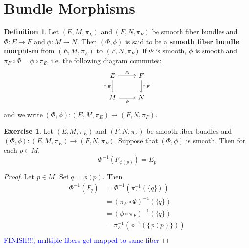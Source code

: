 \documentclass{book}
\theoremstyle{definition}
\newtheorem{defn}[definition]{Definition}
\newtheorem{ex}[definition]{Exercise}
\DeclareMathOperator*{\0}{\mbf{0}}
\DeclareMathOperator*{\1}{\mbf{1}}
\newcommand{\tbf}[1]{\textbf{#1}}
\newcommand{\tcb}[1]{\textcolor{blue}{#1}}
\begin{document}
	
	
	
	
	
	
	
	
	
	
	
	
	
	
	
	
	
	
	
	
	
	
	\newpage
	\section{Bundle Morphisms}
	
	\begin{defn}
		Let $(E, M, \pi_E)$ and $(F, N, \pi_F)$ be smooth fiber bundles and $\Phi: E \rightarrow F$ and $\phi: M \rightarrow N$. Then $(\Phi, \phi)$ is said to be a \tbf{smooth fiber bundle morphism} from $(E, M, \pi_E)$ to $(F, N, \pi_F)$ if $\Phi$ is smooth, $\phi$ is smooth and $\pi_F \circ \Phi = \phi \circ \pi_E$, 
		i.e. the following diagram commutes:
		\[ 
		\begin{tikzcd}
			E \arrow[r, "\Phi"] \arrow[d, "\pi_E"'] & F  \arrow[d, "\pi_F"] \\
			M \arrow[r, "\phi"']                  & N
		\end{tikzcd}
		\] 
		and we write $(\Phi, \phi): (E, M, \pi_E) \rightarrow (F, N, \pi_F)$.
	\end{defn}
	
	\begin{ex}
		Let $(E, M, \pi_E)$ and $(F, N, \pi_F)$ be smooth fiber bundles and $(\Phi, \phi): (E, M, \pi_E) \rightarrow (F, N, \pi_F)$. Suppose that $(\Phi, \phi)$ is smooth. Then for each $p \in M$, 
		$$\Phi^{-1}(F_{\phi(p)}) = E_{p}$$
	\end{ex}

	\begin{proof}
		Let $p \in M$. Set $q = \phi(p)$. Then 
		\begin{align*}
			\Phi^{-1}(F_{q})
			& = \Phi^{-1}(\pi_F^{-1}(\{q\})) \\
			& = (\pi_F \circ \Phi)^{-1}(\{q\}) \\
			& = (\phi \circ \pi_E)^{-1} (\{q\}) \\
			& = \pi_E^{-1} ( \phi^{-1}( \{\phi(p)\})) \\
		\end{align*}
	\tcb{FINISH!!!, multiple fibers get mapped to same fiber}
	\end{proof}
	
\end{document}
